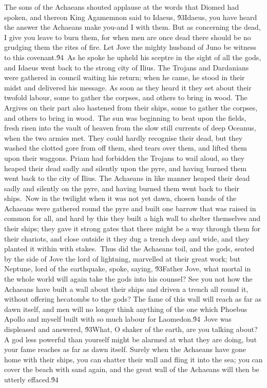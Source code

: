 {The sons of the Achaeans shouted applause at the words that Diomed had spoken, and thereon King Agamemnon said to Idaeus, \'93Idaeus, you have heard the answer the Achaeans make you-and I with them. But as concerning the dead, I give you leave to burn them, for when men are once dead there should be no grudging them the rites of fire. Let Jove the mighty husband of Juno be witness to this covenant.\'94\
As he spoke he upheld his sceptre in the sight of all the gods, and Idaeus went back to the strong city of Ilius. The Trojans and Dardanians were gathered in council waiting his return; when he came, he stood in their midst and delivered his message. As soon as they heard it they set about their twofold labour, some to gather the corpses, and others to bring in wood. The Argives on their part also hastened from their ships, some to gather the corpses, and others to bring in wood.\
The sun was beginning to beat upon the fields, fresh risen into the vault of heaven from the slow still currents of deep Oceanus, when the two armies met. They could hardly recognise their dead, but they washed the clotted gore from off them, shed tears over them, and lifted them upon their waggons. Priam had forbidden the Trojans to wail aloud, so they heaped their dead sadly and silently upon the pyre, and having burned them went back to the city of Ilius. The Achaeans in like manner heaped their dead sadly and silently on the pyre, and having burned them went back to their ships.\
Now in the twilight when it was not yet dawn, chosen bands of the Achaeans were gathered round the pyre and built one barrow that was raised in common for all, and hard by this they built a high wall to shelter themselves and their ships; they gave it strong gates that there might be a way through them for their chariots, and close outside it they dug a trench deep and wide, and they planted it within with stakes.\
Thus did the Achaeans toil, and the gods, seated by the side of Jove the lord of lightning, marvelled at their great work; but Neptune, lord of the earthquake, spoke, saying, \'93Father Jove, what mortal in the whole world will again take the gods into his counsel? See you not how the Achaeans have built a wall about their ships and driven a trench all round it, without offering hecatombs to the gods? The fame of this wall will reach as far as dawn itself, and men will no longer think anything of the one which Phoebus Apollo and myself built with so much labour for Laomedon.\'94\
Jove was displeased and answered, \'93What, O shaker of the earth, are you talking about? A god less powerful than yourself might be alarmed at what they are doing, but your fame reaches as far as dawn itself. Surely when the Achaeans have gone home with their ships, you can shatter their wall and fling it into the sea; you can cover the beach with sand again, and the great wall of the Achaeans will then be utterly effaced.\'94\
}
